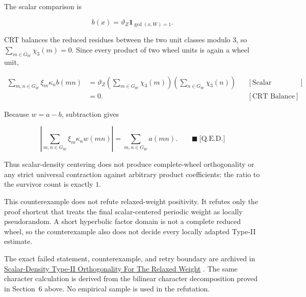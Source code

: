 The scalar comparison is

\begin{equation*}
b(x)=\vartheta_Z\mathbf1_{\gcd(x,W)=1}.
\end{equation*}

CRT balances the reduced residues between the two unit classes modulo $3$,
so $\sum_{m\in G_W}\chi_3(m)=0$. Since every product of two wheel units is
again a wheel unit,

\begin{equation*}
\begin{aligned}
\sum_{m,n\in G_W}\xi_m\kappa_nb(mn)
&=\vartheta_Z
  \left(\sum_{m\in G_W}\chi_3(m)\right)
  \left(\sum_{n\in G_W}\chi_3(n)\right)
&&[\text{Scalar Comparison}]\\
&=0.
&&[\text{CRT Balance}]
\end{aligned}
\end{equation*}

Because $w=a-b$, subtraction gives

\begin{equation*}
\left|
\sum_{m,n\in G_W}\xi_m\kappa_nw(mn)
\right|
=
\sum_{m,n\in G_W}a(mn).
\qquad\blacksquare\ \text{[Q.E.D.]}
\end{equation*}

Thus scalar-density centering does not produce complete-wheel orthogonality or
any strict universal contraction against arbitrary product coefficients:
the ratio to the survivor count is exactly $1$.

This counterexample does not refute relaxed-weight positivity. It refutes only
the proof shortcut that treats the final scalar-centered periodic weight as
locally pseudorandom. A short hyperbolic factor domain is not a complete
reduced wheel, so the counterexample also does not decide every locally
adapted Type-II estimate.

The exact failed statement, counterexample, and retry boundary are archived
in \href{https://github.com/thiagomata/prime-numbers/blob/master/candidates/refuted/relaxed-weight-scalar-density-type-ii.md}{Scalar-Density Type-II Orthogonality For The Relaxed Weight} \cite{refutedtypeii2026}. The same
character calculation is derived from the bilinear character decomposition
proved in Section~6 above. No empirical sample is used in the
refutation.
